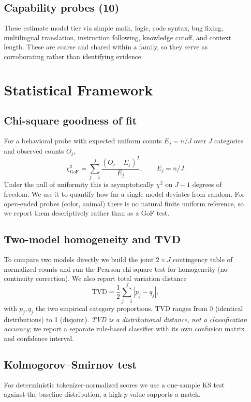 \documentclass[11pt]{article}
\begin{document}
\subsection{Capability probes (10)}
These estimate model tier via simple math, logic, code syntax, bug fixing, multilingual translation, instruction following, knowledge cutoff, and context length. These are coarse and shared within a family, so they serve as corroborating rather than identifying evidence.

\section{Statistical Framework}
\label{sec:stats}

\subsection{Chi-square goodness of fit}
For a behavioral probe with expected uniform counts $E_j=n/J$ over $J$ categories and observed counts $O_j$,
\begin{equation}
\chi^2_{\mathrm{GoF}} = \sum_{j=1}^{J} \frac{(O_j - E_j)^2}{E_j}, \qquad E_j = n/J .
\end{equation}
Under the null of uniformity this is asymptotically $\chi^2$ on $J-1$ degrees of freedom. We use it to quantify how far a single model deviates from random. For open-ended probes (color, animal) there is no natural finite uniform reference, so we report them descriptively rather than as a GoF test.

\subsection{Two-model homogeneity and TVD}
To compare two models directly we build the joint $2\times J$ contingency table of normalized counts and run the Pearson chi-square test for homogeneity (no continuity correction). We also report total variation distance
\begin{equation}
\mathrm{TVD} = \frac{1}{2}\sum_{j=1}^{J} \left| p_j - q_j \right|,
\end{equation}
with $p_j,q_j$ the two empirical category proportions. TVD ranges from 0 (identical distributions) to 1 (disjoint). \emph{TVD is a distributional distance, not a classification accuracy}; we report a separate rule-based classifier with its own confusion matrix and confidence interval.

\subsection{Kolmogorov--Smirnov test}
For deterministic tokenizer-normalized scores we use a one-sample KS test against the baseline distribution; a high $p$-value supports a match.
\end{document}
